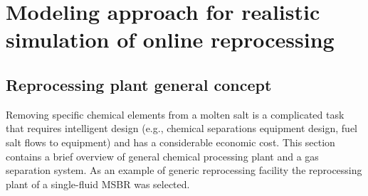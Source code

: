 \chapter[Modeling approach for realistic simulation of online reprocessing]{Modeling approach for realistic simulation of online reprocessing}

\section{Reprocessing plant general concept}
Removing specific chemical elements from a molten salt is a complicated 
task that requires intelligent design (e.g., chemical separations 
equipment design, fuel salt flows to equipment) and has a considerable 
economic cost. This section contains a brief overview of general 
chemical processing plant and a gas separation system. As an example 
of generic reprocessing facility the reprocessing plant of a single-fluid 
\gls{MSBR} was selected.

